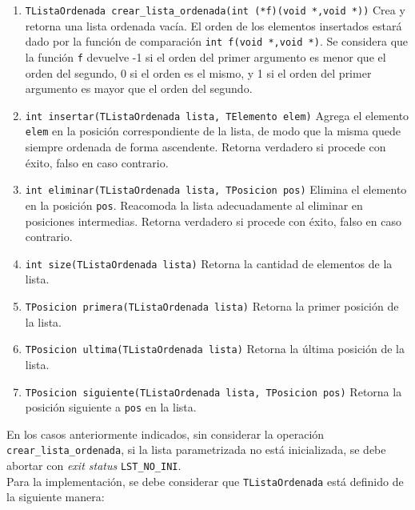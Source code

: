 \documentclass[12pt,a4paper]{article}
\begin{document}
\begin{enumerate}
	
	\item \texttt{TListaOrdenada crear\_lista\_ordenada(int (*f)(void *,void *))} Crea y retorna una lista ordenada vacía. El orden de los elementos insertados estará dado por la función de comparación \texttt{int f(void *,void *)}. Se considera que la función \texttt{f} devuelve -1 si el orden del primer argumento es menor que el orden del segundo, 0 si el orden es el mismo, y 1 si el orden del primer argumento es mayor que el orden del segundo.
	
	\item \texttt{int insertar(TListaOrdenada lista,  TElemento elem)} Agrega el elemento \texttt{elem} en la posición correspondiente de la lista, de modo que la misma quede siempre ordenada de forma ascendente. Retorna verdadero si procede con éxito, falso en caso contrario.
	
	\item \texttt{int eliminar(TListaOrdenada lista, TPosicion pos)} Elimina el elemento en la posición \texttt{pos}. Reacomoda la lista adecuadamente al eliminar en posiciones intermedias. Retorna verdadero si procede con éxito, falso en caso contrario.
	
	\item \texttt{int size(TListaOrdenada lista)} Retorna la cantidad de elementos de la lista.
	
	\item \texttt{TPosicion primera(TListaOrdenada lista)} Retorna la primer posición de la lista.
	
	\item \texttt{TPosicion ultima(TListaOrdenada lista)} Retorna la última posición de la lista.

	\item \texttt{TPosicion siguiente(TListaOrdenada lista, TPosicion pos)} Retorna la posición siguiente a \texttt{pos} en la lista.
	
\end{enumerate}

En los casos anteriormente indicados, sin considerar la operación \texttt{crear\_lista\_ordenada}, si la lista parametrizada no está inicializada, se debe abortar con \emph{exit status} \texttt{LST\_NO\_INI}. \\

Para la implementación, se debe considerar que \texttt{TListaOrdenada} está definido de la siguiente manera:
\end{document}
